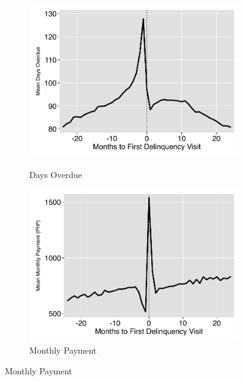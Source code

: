 \documentclass[12pt]{article}
\begin{document}
\begin{figure}[hbtp]
\begin{subfigure}[b]{0.49\textwidth}
        \label{fig:line_bal}
    \end{subfigure}
    \vskip 1mm \vskip 0pt
    \begin{subfigure}[b]{0.49\textwidth}
        \centering
        \caption[]{\small Days Overdue}
        \vspace{-1mm}
        \includegraphics[width=\textwidth,trim={.2cm .2cm .2cm 0cm}, clip=true]{tables/line1_ar}
        \label{fig:line_ar}
    \end{subfigure}
    \hfill
    \begin{subfigure}[b]{0.49\textwidth}  
        \centering
        \caption[]{\small Monthly Payment}  
        \vspace{-1mm}
        \includegraphics[width=\textwidth,trim={.2cm .2cm .2cm 0cm}, clip=true]{tables/line1_pay}

\end{subfigure}
\end{figure}
\end{document}
